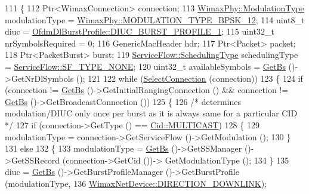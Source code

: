 \begin{DoxyCode}
111 \{
112   Ptr<WimaxConnection> connection;
113   \hyperlink{classns3_1_1WimaxPhy_a044c5d8a48ca992c39c2a946f6e755fa}{WimaxPhy::ModulationType} modulationType = 
      \hyperlink{classns3_1_1WimaxPhy_a044c5d8a48ca992c39c2a946f6e755faaef0b78541d9b66d4e85780131e665028}{WimaxPhy::MODULATION\_TYPE\_BPSK\_12};
114   uint8\_t diuc = \hyperlink{classns3_1_1OfdmDlBurstProfile_a4769c73985bf918ecd21180081471a00a7551a9c00acee92830f4d780803de0c0}{OfdmDlBurstProfile::DIUC\_BURST\_PROFILE\_1};
115   uint32\_t nrSymbolsRequired = 0;
116   GenericMacHeader hdr;
117   Ptr<Packet> packet;
118   Ptr<PacketBurst> burst;
119   \hyperlink{classns3_1_1ServiceFlow_a7990ba10be1e098328fd1e6382a26235}{ServiceFlow::SchedulingType} schedulingType = 
      \hyperlink{classns3_1_1ServiceFlow_a7990ba10be1e098328fd1e6382a26235a1c9639853c5529ae013feddcae94a4c6}{ServiceFlow::SF\_TYPE\_NONE};
120   uint32\_t availableSymbols = \hyperlink{classns3_1_1BSScheduler_a8b09065ac8f74cb35446af55128e41c7}{GetBs} ()->GetNrDlSymbols ();
121 
122   \textcolor{keywordflow}{while} (\hyperlink{classns3_1_1BSSchedulerSimple_a38af9d126b6028a3ab1be504feee1ccd}{SelectConnection} (connection))
123     \{
124       \textcolor{keywordflow}{if} (connection != \hyperlink{classns3_1_1BSScheduler_a8b09065ac8f74cb35446af55128e41c7}{GetBs} ()->GetInitialRangingConnection () && connection != 
      \hyperlink{classns3_1_1BSScheduler_a8b09065ac8f74cb35446af55128e41c7}{GetBs} ()->GetBroadcastConnection ())
125         \{
126           \textcolor{comment}{/* determines modulation/DIUC only once per burst as it is always same for a particular CID */}
127           \textcolor{keywordflow}{if} (connection->GetType () == \hyperlink{classns3_1_1Cid_a10b8f92080ca5790e65a0bfa2f557e0aa4d3bf31623ed09b9755d86bdfa345a4a}{Cid::MULTICAST})
128             \{
129               modulationType = connection->GetServiceFlow ()->GetModulation ();
130             \}
131           \textcolor{keywordflow}{else}
132             \{
133               modulationType = \hyperlink{classns3_1_1BSScheduler_a8b09065ac8f74cb35446af55128e41c7}{GetBs} ()->GetSSManager ()->GetSSRecord (connection->GetCid ())->
      GetModulationType ();
134             \}
135           diuc = \hyperlink{classns3_1_1BSScheduler_a8b09065ac8f74cb35446af55128e41c7}{GetBs} ()->GetBurstProfileManager ()->GetBurstProfile (modulationType,
136                                                                        
      \hyperlink{classns3_1_1WimaxNetDevice_a194b6cf7eb59582328eb2531dc9ed884a5873dae7c36e21d904ae2d6922835e89}{WimaxNetDevice::DIRECTION\_DOWNLINK});

\end{DoxyCode}

